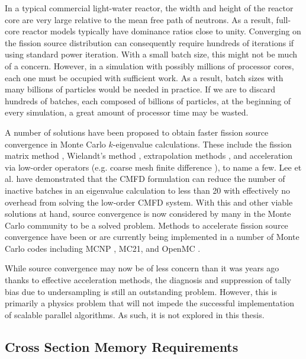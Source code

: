 In a typical commercial light-water reactor, the width and height of the reactor
core are very large relative to the mean free path of neutrons. As a result,
full-core reactor models typically have dominance ratios close to
unity. Converging on the fission source distribution can consequently require
hundreds of iterations if using standard power iteration. With a small batch
size, this might not be much of a concern. However, in a simulation with
possibly millions of processor cores, each one must be occupied with sufficient
work. As a result, batch sizes with many billions of particles would be needed
in practice. If we are to discard hundreds of batches, each composed of billions
of particles, at the beginning of every simulation, a great amount of processor
time may be wasted.

A number of solutions have been proposed to obtain faster fission source
convergence in Monte Carlo $k$-eigenvalue calculations. These include the
fission matrix method \cite{ane-dufek-2007, lanl-carney-2012}, Wielandt's method
\cite{jnst-yamamoto-2004, mc-brown-2007}, extrapolation methods
\cite{mc-toth-2007-1, mc-toth-2007-2}, and acceleration via low-order operators
(e.g. coarse mesh finite difference \cite{physor-lee-2010, sna-lee-2010,
  physor-lee-2012}), to name a few. Lee et al. \cite{physor-lee-2012} have
demonstrated that the CMFD formulation can reduce the number of inactive batches
in an eigenvalue calculation to less than 20 with effectively no overhead from
solving the low-order CMFD system. With this and other viable solutions at hand,
source convergence is now considered by many in the Monte Carlo community to be
a solved problem. Methods to accelerate fission source convergence have been or
are currently being implemented in a number of Monte Carlo codes including MCNP
\cite{lanl-young-2011}, MC21, and OpenMC \cite{mc-romano-2013}.

While source convergence may now be of less concern than it was years ago thanks
to effective acceleration methods, the diagnosis and suppression of tally bias
due to undersampling \cite{nse-ueki-2005, nse-ueki-2008, jnst-ueki-2011} is
still an outstanding problem. However, this is primarily a physics problem that
will not impede the successful implementation of scalable parallel
algorithms. As such, it is not explored in this thesis.

\subsection{Cross Section Memory Requirements}
\label{sec:cross-section-memory}

